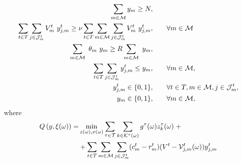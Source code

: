 \documentclass[a4paper,11pt]{article}
\begin{document}
	\begin{alignat}{2}
		\sum\limits_{m \in \cal {M}} y_{m}\geq{N}, & \qquad
		\label{eq3}\\
		\sum\limits_{t \in T} \sum\limits_{j \in {\cal J}^t_{m}} V_{m}^{t} \ y_{j,m}^{t} \geq \nu \sum\limits_{t \in T} \sum\limits_{m \in {\cal M}} \sum\limits_{j \in {\cal J}^t_{m}} V_{m}^{t} \ y_{j,m}^{t}, & \qquad \forall m \in {\cal M}
		\label{eq3.2}\\
		\sum\limits_{m \in {{\cal M}}} \ \theta_{m} \ y_{m}  \geq {R} \sum\limits_{m \in {\cal M}} \ y_{m}, & \qquad \label{eq4}\\
		\sum\limits_{t \in T} \sum\limits_{j \in {\cal J}^t_{m}} y_{j,m}^{t} \leq y_{m}, & \qquad \forall m \in \cal M, \label{eq5}\\
		y_{j,m}^t \in \{0, 1\}, & \qquad \forall t \in T, m \in {\cal M}, j \in {\cal J}^t_{m}, \label{eq6}\\
		y_{m} \in \{0, 1\}, & \qquad \forall m \in \cal M \label{eq7},
	\end{alignat}
	\noindent where  
	\begin{equation}
		\begin{split}
			Q \left(y,\xi (\omega)\right) = & \min_{z(\omega), x(\omega)} 
			\sum\limits_{\tau \in \cal T}\sum\limits_{k \in \cal K^{\tau}(\omega)} g^{\tau}(\omega) z_k^{\tau}(\omega) \; + \\
			& + \sum\limits_{t \in T} \sum\limits_{m \in {\cal M}} \sum\limits_{j \in {\cal J}^t_{m}} (c_{m}^t-r_{m}^t)(V^{t} - {\cal V}_{j,m}^t(\omega)) y_{j,m}^t \label{eq8}
		\end{split}
	\end{equation}
\end{document}
